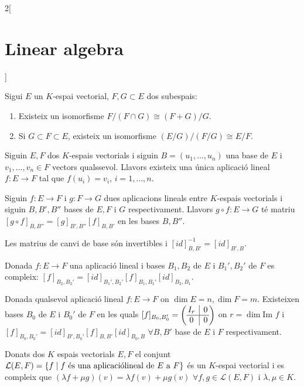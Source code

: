 \documentclass[../../../main.tex]{subfiles}
\begin{document}
\begin{multicols}{2}[\section{Linear algebra}]
\begin{corollary}
\end{corollary}
\begin{theorem}
Sigui $E$ un $K$-espai vectorial, $F,G\subset E$ dos subespais:
\begin{enumerate}
    \item Existeix un isomorfisme $F/(F\cap G)\cong(F+G)/G$.
    \item Si $G\subset F\subset E$, existeix un isomorfisme $(E/G)/(F/G)\cong E/F$.
\end{enumerate}
\end{theorem}
\begin{theorem}
Siguin $E,F$ dos $K$-espais vectorials i siguin $B=(u_1,\ldots,u_n)$ una base de $E$ i $v_1,\ldots,v_n\in F$ vectors qualssevol. Llavors existeix una única aplicació lineal $f:E\rightarrow F$ tal que $f(u_i)=v_i$, $i=1,\ldots,n$. 
\end{theorem}
\begin{prop}
Siguin $f:E\rightarrow F$ i $g:F\rightarrow G$ dues aplicacions lineals entre $K$-espais vectorials i siguin $B,B',B''$ bases de $E,F$ i $G$ respectivament. Llavors $g\circ f:E\rightarrow G$ té matriu $[g\circ f]_{B,B''}=[g]_{B',B''}[f]_{B,B'}$ en les bases $B, B''$.
\end{prop}
\begin{corollary}
Les matrius de canvi de base són invertibles i $[id]_{B,B'}^{-1}=[id]_{B',B}$.
\end{corollary}
\begin{prop}
Donada $f:E\rightarrow F$ una aplicació lineal i bases $B_1,B_2$ de $E$ i $B_1',B_2'$ de $F$ es compleix: $[f]_{B_2,B_2'}=[id]_{B_1',B_2'}[f]_{B_1,B_1'}[id]_{B_2,B_1}$.
\end{prop}
\begin{theorem}
Donada qualsevol aplicació lineal $f:E\rightarrow F$ on $\dim E=n, \dim F=m$. Existeixen bases $B_0$ de $E$ i $B_0'$ de $F$ en les quals $[f]_{B_0,B_0'}=\left(\begin{array}{@{\,} c|c @{\,}}
    I_r & 0\\
    \hline
    0 & 0
    \end{array}\right)$ on $r=\dim\text{Im }f$ i $[f]_{B_0,B_0'}=[id]_{B',B_0'}[f]_{B,B'}[id]_{B_0,B}$ $\forall B,B'$ base de $E$ i $F$ respectivament.
\end{theorem}
\begin{lemma}
Donats dos $K$ espais vectorials $E,F$ el conjunt $\mathcal{L}(E,F)=\{f\mid f\text{ és una aplicació}\\ \text{lineal de $E$ a $F$}\}$ és un $K$-espai vectorial i es compleix que $(\lambda f+\mu g)(v)=\lambda f(v)+\mu g(v)$ $\forall f,g\in\mathcal{L}(E,F)$ i $\lambda,\mu\in K$.

\end{lemma}
\end{multicols}
\end{document}
